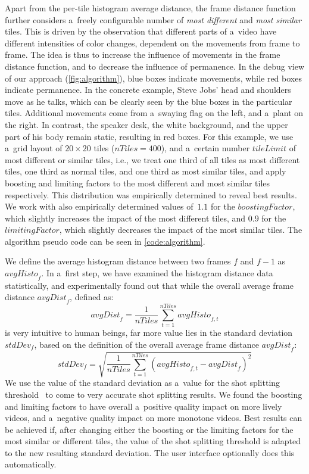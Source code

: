 \documentclass{sig-alternate}
\begin{document}
Apart from the per-tile histogram average distance, the frame distance function further considers a~freely configurable number of \emph{most different} and \emph{most similar} tiles. This is driven by the observation that different parts of a~video have different intensities of color changes, dependent on the movements from frame to frame. The idea is thus to increase the influence of movements in the frame distance function, and to decrease the influence of permanence. In the debug view of our approach (\autoref{fig:algorithm}), blue boxes indicate movements, while red boxes indicate permanence. In the concrete example, Steve Jobs' head and shoulders move as he talks, which can be clearly seen by the blue boxes in the particular tiles. Additional movements come from a~swaying flag on the left, and a~plant on the right. In contrast, the speaker desk, the white background, and the upper part of his body remain static, resulting in red boxes. For this example, we use a~grid layout of $\mathit{20} \times \mathit{20}$ tiles ($\mathit{nTiles} = \mathit{400}$), and a~certain number $\mathit{tileLimit}$ of most different or similar tiles, i.e., we treat one third of all tiles as most different tiles, one third as normal tiles, and one third as most similar tiles, and apply boosting and limiting factors to the most different and most similar tiles respectively. This distribution was empirically determined to reveal best results. We work with also empirically determined values of~$\mathit{1.1}$ for the $\mathit{boostingFactor}$, which slightly increases the impact of the most different tiles, and $\mathit{0.9}$ for the $\mathit{limitingFactor}$, which slightly decreases the impact of the most similar tiles. The algorithm pseudo code can be seen in \autoref{code:algorithm}.

We define the average histogram distance between two frames $\mathit{f}$ and $\mathit{f - 1}$ as $\mathit{avgHisto}_{f}$. In a~first step, we have examined the histogram distance data statistically, and experimentally found out that while the overall average frame distance $\mathit{avgDist}_{f}$, defined as: $$\mathit{avgDist}_{f} = \frac{1}{\mathit{nTiles}}\sum_{t=1}^{\mathit{nTiles}}\mathit{avgHisto}_{f, t}$$ is very intuitive to human beings, far more value lies in the standard deviation $\mathit{stdDev}_{f}$, based on the definition of the overall average frame distance $\mathit{avgDist}_{f}$: $$\mathit{stdDev}_{f} = \sqrt{\frac{1}{\mathit{nTiles}}\sum_{t=1}^{\mathit{nTiles}}(\mathit{avgHisto}_{f, t} - \mathit{avgDist}_{f})^{2}}$$ We use the value of the standard deviation as a~value for the shot splitting threshold~\cite{Lienhart1999} to come to very accurate shot splitting results. We found the boosting and limiting factors to have overall a~positive quality impact on more lively videos, and a~negative quality impact on more monotone videos. Best results can be achieved if, after changing either the boosting or the limiting factors for the most similar or different tiles, the value of the shot splitting threshold is adapted to the new resulting standard deviation. The user interface optionally does this automatically.
\end{document}
